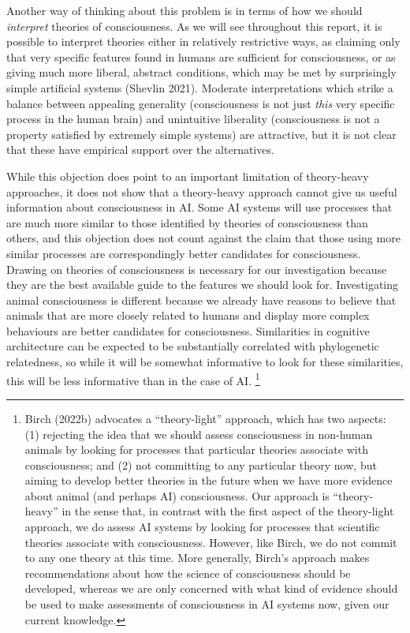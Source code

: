 \documentclass[12pt]{article}
\begin{document}
Another way of thinking about this problem is in terms of how we should \textit{interpret} theories of consciousness. As we will see throughout this report, it is possible to interpret theories either in relatively restrictive ways, as claiming only that very specific features found in humans are sufficient for consciousness, or as giving much more liberal, abstract conditions, which may be met by surprisingly simple artificial systems (Shevlin 2021). Moderate interpretations which strike a balance between appealing generality (consciousness is not just \textit{this} very specific process in the human brain) and unintuitive liberality (consciousness is not a property satisfied by extremely simple systems) are attractive, but it is not clear that these have empirical support over the alternatives.

While this objection does point to an important limitation of theory-heavy approaches, it does not show that a theory-heavy approach cannot give us useful information about consciousness in AI. Some AI systems will use processes that are much more similar to those identified by theories of consciousness than others, and this objection does not count against the claim that those using more similar processes are correspondingly better candidates for consciousness. Drawing on theories of consciousness is necessary for our investigation because they are the best available guide to the features we should look for. Investigating animal consciousness is different because we already have reasons to believe that animals that are more closely related to humans and display more complex behaviours are better candidates for consciousness. Similarities in cognitive architecture can be expected to be substantially correlated with phylogenetic relatedness, so while it will be somewhat informative to look for these similarities, this will be less informative than in the case of AI. \footnote{Birch (2022b) advocates a ``theory-light'' approach, which has two aspects: (1) rejecting the idea that we should assess consciousness in non-human animals by looking for processes that particular theories associate with consciousness; and (2) not committing to any particular theory now, but aiming to develop better theories in the future when we have more evidence about animal (and perhaps AI) consciousness. Our approach is ``theory-heavy'' in the sense that, in contrast with the first aspect of the theory-light approach, we do assess AI systems by looking for processes that scientific theories associate with consciousness. However, like Birch, we do not commit to any one theory at this time. More generally, Birch’s approach makes recommendations about how the science of consciousness should be developed, whereas we are only concerned with what kind of evidence should be used to make assessments of consciousness in AI systems now, given our current knowledge.}
\end{document}
